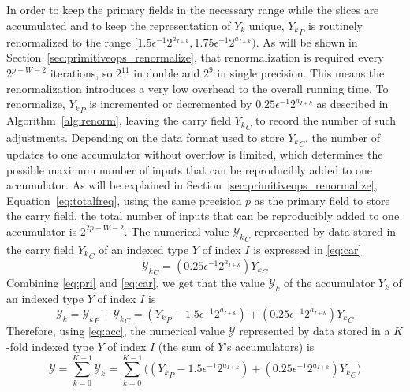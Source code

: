       In order to keep the primary fields in the necessary range while the
      slices are accumulated and to keep the representation of $Y_k$ unique,
      ${Y_k}_P$ is routinely renormalized to the range 
      \(
        [1.5 \epsilon^{-1} 2^{a_{I + k}}, 1.75 \epsilon^{-1} 2^{a_{I + k}}).
      \)
      As will be shown in Section~\ref{sec:primitiveops_renormalize},
      that renormalization is required every $2^{p-W-2}$ iterations,
      so $2^{11}$ in double and $2^9$ in single precision.
      This means the renormalization introduces a very low overhead
      to the overall running time.
      To renormalize, ${Y_k}_P$ is incremented or decremented by
      $0.25 \epsilon^{-1} 2^{a_{I + k}}$ as described in Algorithm~\ref{alg:renorm},
      leaving the carry field ${Y_k}_C$ to record the number of such adjustments.
      Depending on the data format used to store ${Y_k}_C$, the number of
      updates to one accumulator without overflow is limited,
      which determines the possible maximum number of inputs that can be
      reproducibly added to one accumulator.
      As will be explained in Section~\ref{sec:primitiveops_renormalize},
      Equation~\eqref{eq:totalfreq}, using the same precision $p$ as the primary field
      to store the carry field, the total number of inputs
      that can be reproducibly added to one accumulator is $2^{2p-W-2}$.
      The numerical value ${\mathcal{Y}_k}_C$ represented by data stored in the carry field
      ${Y_k}_C$ of an indexed type $Y$ of index $I$ is expressed in
      \eqref{eq:car}
      \begin{equation}
        {\mathcal{Y}_k}_C = (0.25\epsilon^{-1}2^{a_{I + k}}){Y_k}_C
        \label{eq:car}
      \end{equation}
      Combining \eqref{eq:pri} and \eqref{eq:car}, we get that the value $\mathcal{Y}_k$ of the accumulator $Y_k$ of an indexed type $Y$ of index $I$ is
      \begin{equation}
        \mathcal{Y}_k = {\mathcal{Y}_k}_P + {\mathcal{Y}_k}_C = ({Y_k}_P - 1.5 \epsilon^{-1}2^{a_{I + k}}) + (0.25\epsilon^{-1}2^{a_{I + k}}){Y_k}_C
        \label{eq:acc}
      \end{equation}
      Therefore, using  \eqref{eq:acc}, the numerical value $\mathcal{Y}$ represented by data stored in a $K$-fold indexed type $Y$ of index $I$ (the sum of $Y$'s accumulators) is
      \begin{equation}
        \mathcal{Y} = \sum\limits_{k = 0}^{K - 1} \mathcal{Y}_k = \sum\limits_{k = 0}^{K - 1} \bigl(({Y_k}_P - 1.5 \epsilon^{-1}2^{a_{I + k}}) + (0.25\epsilon^{-1}2^{a_{I + k}}){Y_k}_C\bigr)
        \label{eq:indexedvalue}
      \end{equation}
